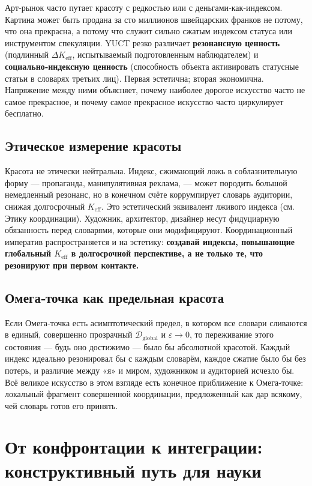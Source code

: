 \documentclass[12pt,a4paper]{article}
\begin{document}
	Арт‑рынок часто путает красоту с редкостью или с деньгами‑как‑индексом. Картина может быть продана за сто миллионов швейцарских франков не потому, что она прекрасна, а потому что служит сильно сжатым индексом статуса или инструментом спекуляции. YUCT резко различает \textbf{резонансную ценность} (подлинный \(\Delta K_{\mathrm{eff}}\), испытываемый подготовленным наблюдателем) и \textbf{социально‑индексную ценность} (способность объекта активировать статусные статьи в словарях третьих лиц). Первая эстетична; вторая экономична. Напряжение между ними объясняет, почему наиболее дорогое искусство часто не самое прекрасное, и почему самое прекрасное искусство часто циркулирует бесплатно.
	
	\subsection{Этическое измерение красоты}
	
	Красота не этически нейтральна. Индекс, сжимающий ложь в соблазнительную форму — пропаганда, манипулятивная реклама, — может породить большой немедленный резонанс, но в конечном счёте коррумпирует словарь аудитории, снижая долгосрочный \(K_{\mathrm{eff}}\). Это эстетический эквивалент лживого индекса (см. Этику координации). Художник, архитектор, дизайнер несут фидуциарную обязанность перед словарями, которые они модифицируют. Координационный императив распространяется и на эстетику: \textbf{создавай индексы, повышающие глобальный \(K_{\mathrm{eff}}\) в долгосрочной перспективе, а не только те, что резонируют при первом контакте.}
	
	\subsection{Омега‑точка как предельная красота}
	
	Если Омега‑точка есть асимптотический предел, в котором все словари сливаются в единый, совершенно прозрачный \(\mathcal{D}_{\text{global}}\) и \(\varepsilon \to 0\), то переживание этого состояния — будь оно достижимо — было бы абсолютной красотой. Каждый индекс идеально резонировал бы с каждым словарём, каждое сжатие было бы без потерь, и различие между «я» и миром, художником и аудиторией исчезло бы. Всё великое искусство в этом взгляде есть конечное приближение к Омега‑точке: локальный фрагмент совершенной координации, предложенный как дар всякому, чей словарь готов его принять.
	
	\section{От конфронтации к интеграции: конструктивный путь для науки}
	
\end{document}
